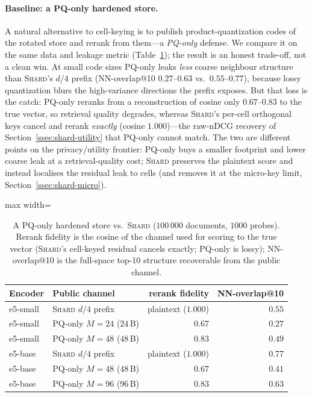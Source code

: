 \paragraph{Baseline: a PQ-only hardened store.} A natural alternative to
cell-keying is to publish product-quantization codes of the rotated store
and rerank from them---a \emph{PQ-only} defense. We compare it on the same
data and leakage metric (Table~\ref{tab:shard-pq-only}); the result is an
honest trade-off, not a clean win. At small code sizes PQ-only leaks
\emph{less} coarse neighbour structure than \textsc{Shard}'s $d/4$ prefix
(NN-overlap@10 $0.27$--$0.63$ vs.\ $0.55$--$0.77$), because lossy
quantization blurs the high-variance directions the prefix exposes. But that
loss is the catch: PQ-only reranks from a reconstruction of cosine only
$0.67$--$0.83$ to the true vector, so retrieval quality degrades, whereas
\textsc{Shard}'s per-cell orthogonal keys cancel and rerank \emph{exactly}
(cosine $1.000$)---the raw-nDCG recovery of Section~\ref{ssec:shard-utility}
that PQ-only cannot match. The two are different points on the
privacy/utility frontier: PQ-only buys a smaller footprint and lower coarse
leak at a retrieval-quality cost; \textsc{Shard} preserves the plaintext score
and instead localises the residual leak to cells (and removes it at the
micro-key limit, Section~\ref{ssec:shard-micro}).

\begin{table}[tbp]
\begin{singlespace}
\centering
\caption{A PQ-only hardened store vs.\ \textsc{Shard} ($100\,000$ documents,
$1000$ probes). Rerank fidelity is the cosine of the channel used for
scoring to the true vector (\textsc{Shard}'s cell-keyed residual cancels
exactly; PQ-only is lossy); NN-overlap@10 is the full-space top-10 structure
recoverable from the public channel.}
\label{tab:shard-pq-only}
\small
\begin{adjustbox}{max width=\linewidth}
\begin{tabular}{@{}llrr@{}}
\toprule
Encoder & Public channel & rerank fidelity & NN-overlap@10 \\ \midrule
e5-small & \textsc{Shard} $d/4$ prefix & plaintext ($1.000$) & $0.55$ \\
e5-small & PQ-only $M{=}24$ ($24$\,B) & $0.67$ & $0.27$ \\
e5-small & PQ-only $M{=}48$ ($48$\,B) & $0.83$ & $0.49$ \\ \midrule
e5-base & \textsc{Shard} $d/4$ prefix & plaintext ($1.000$) & $0.77$ \\
e5-base & PQ-only $M{=}48$ ($48$\,B) & $0.67$ & $0.41$ \\
e5-base & PQ-only $M{=}96$ ($96$\,B) & $0.83$ & $0.63$ \\
\bottomrule
\end{tabular}
\end{adjustbox}
\end{singlespace}
\end{table}

